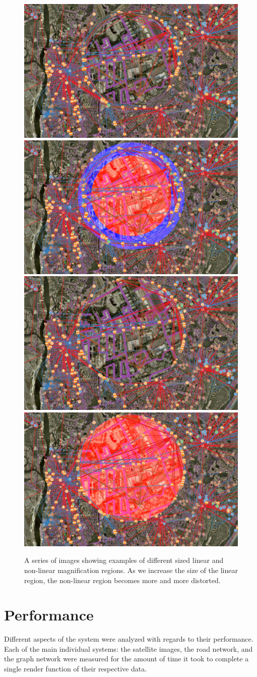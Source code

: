 \begin{figure}[htp]
    \vspace{3 mm}
    \includegraphics[width=0.40\linewidth]{img/20_three_quarter.jpg}
    \includegraphics[width=0.40\linewidth]{img/20_three_quarter_color.jpg}
    \vspace{3 mm}
    \includegraphics[width=0.40\linewidth]{img/20_only_linear.jpg}
    \includegraphics[width=0.40\linewidth]{img/20_only_linear_color.jpg}
    \caption[Various Inner and Outer Radius Ratios]{A series of images showing examples of different sized linear and non-linear magnification regions. As we increase the size of the linear region, the non-linear region becomes more and more distorted.}
    \label{fig:ratio}
\end{figure}
    

\section{Performance}
\label{section:performance_results}

Different aspects of the system were analyzed with regards to their performance. Each of the main individual systems: the satellite images, the road network, and the graph network were measured for the amount of time it took to complete a single render function of their respective data. 

